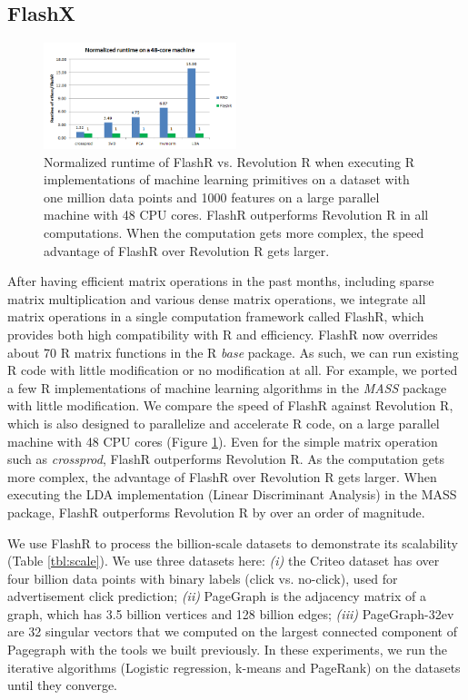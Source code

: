 \documentclass[simplex.tex]{subfiles}
\begin{document}
\subsection{FlashX}
\begin{figure}[h!]
\begin{cframed}
\centering
\includegraphics[width=0.5\textwidth]{../../figs/FlashR.vs.RRO.png}
\caption{
Normalized runtime of FlashR vs. Revolution R when executing R implementations
of machine learning primitives on a dataset with one million data points and
1000 features on a large parallel machine with
48 CPU cores. FlashR outperforms Revolution R in all computations. When
the computation gets more complex, the speed advantage of FlashR
over Revolution R gets larger.
}
\label{fig:flashr}
\end{cframed}
\end{figure}

After having efficient matrix operations in the past months, including sparse
matrix multiplication and various dense matrix operations, we integrate all
matrix operations in a single computation framework called FlashR, which
provides both high compatibility with R and efficiency. FlashR now overrides
about 70 R matrix functions in the R
\textit{base} package. As such, we can run existing R code with little
modification or no modification at all. For example, we ported a few R
implementations of machine learning algorithms in the \textit{MASS} package
with little modification. We compare the speed of FlashR against Revolution R,
which is also designed to parallelize and accelerate R code, on a large parallel
machine with 48 CPU cores (Figure \ref{fig:flashr}).
Even for the simple matrix operation such as \textit{crossprod}, FlashR
outperforms Revolution R. As the computation gets more complex, the advantage
of FlashR over Revolution R gets larger. When executing the LDA implementation
(Linear Discriminant Analysis) in the MASS package, FlashR outperforms Revolution R
by over an order of magnitude.

\clearpage


We use FlashR to process the billion-scale datasets to demonstrate its
scalability (Table \ref{tbl:scale}). We use three datasets here: \textit{(i)}
the Criteo dataset has over four billion data points with binary labels
(click vs. no-click), used for advertisement click prediction;
\textit{(ii)} PageGraph is the adjacency matrix of a graph, which has 3.5
billion vertices and 128 billion edges;
\textit{(iii)} PageGraph-32ev are 32 singular vectors that we computed on
the largest connected component of Pagegraph with the tools we built previously.
In these experiments, we run the iterative algorithms
(Logistic regression, k-means and PageRank) on the datasets until they converge.
\end{document}
